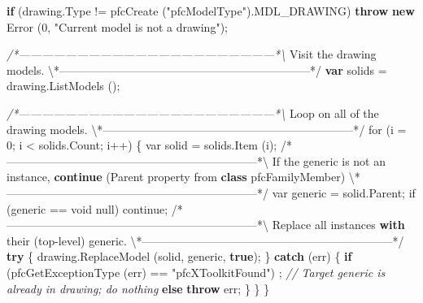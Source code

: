 \documentclass[]{article}
\newenvironment{Shaded}{}{}
\newcommand{\KeywordTok}[1]{\textcolor[rgb]{0.00,0.44,0.13}{\textbf{{#1}}}}
\newcommand{\DecValTok}[1]{\textcolor[rgb]{0.25,0.63,0.44}{{#1}}}
\newcommand{\FloatTok}[1]{\textcolor[rgb]{0.25,0.63,0.44}{{#1}}}
\newcommand{\StringTok}[1]{\textcolor[rgb]{0.25,0.44,0.63}{{#1}}}
\newcommand{\CommentTok}[1]{\textcolor[rgb]{0.38,0.63,0.69}{\textit{{#1}}}}
\newcommand{\OtherTok}[1]{\textcolor[rgb]{0.00,0.44,0.13}{{#1}}}
\newcommand{\FunctionTok}[1]{\textcolor[rgb]{0.02,0.16,0.49}{{#1}}}
\newcommand{\NormalTok}[1]{{#1}}
\begin{document}
\begin{Shaded}
\begin{Highlighting}[]
  \KeywordTok{if} \NormalTok{(}\OtherTok{drawing}\NormalTok{.}\FunctionTok{Type} \NormalTok{!= }\FunctionTok{pfcCreate} \NormalTok{(}\StringTok{"pfcModelType"}\NormalTok{).}\FunctionTok{MDL_DRAWING}\NormalTok{)}
    \KeywordTok{throw} \KeywordTok{new} \FunctionTok{Error} \NormalTok{(}\DecValTok{0}\NormalTok{, }\StringTok{"Current model is not a drawing"}\NormalTok{);}
    
\CommentTok{/*------------------------------------------------------------------*\textbackslash{}}
  \NormalTok{Visit the drawing }\OtherTok{models}\NormalTok{.}
\NormalTok{\textbackslash{}*------------------------------------------------------------------*}\OtherTok{/}
  \KeywordTok{var} \NormalTok{solids = }\OtherTok{drawing}\NormalTok{.}\FunctionTok{ListModels} \NormalTok{();}
  
\CommentTok{/*------------------------------------------------------------------*\textbackslash{}}
  \NormalTok{Loop on all of the drawing }\OtherTok{models}\NormalTok{.}
\NormalTok{\textbackslash{}*------------------------------------------------------------------*}\OtherTok{/  }
\OtherTok{  for }\FloatTok{(}\OtherTok{i = 0; i < solids.Count; i}\FloatTok{++)}
\OtherTok{    \{}
\OtherTok{      var solid = solids.Item }\FloatTok{(}\OtherTok{i}\FloatTok{)}\OtherTok{;}
\OtherTok{/}\NormalTok{*------------------------------------------------------------------*\textbackslash{}}
  \NormalTok{If the generic is not an instance, }\KeywordTok{continue} \NormalTok{(Parent property }
  \NormalTok{from }\KeywordTok{class} \NormalTok{pfcFamilyMember)}
\NormalTok{\textbackslash{}*------------------------------------------------------------------*}\OtherTok{/ }
\OtherTok{      var generic = solid.Parent;}
\OtherTok{      }
\OtherTok{      if }\FloatTok{(}\OtherTok{generic == void null}\FloatTok{)}
\OtherTok{        continue;}
\OtherTok{      }
\OtherTok{/}\NormalTok{*------------------------------------------------------------------*\textbackslash{}}
  \NormalTok{Replace all instances }\KeywordTok{with} \FunctionTok{their} \NormalTok{(top-level) }\OtherTok{generic}\NormalTok{.}
\NormalTok{\textbackslash{}*------------------------------------------------------------------*}\OtherTok{/}
      \KeywordTok{try}
    \NormalTok{\{}
      \OtherTok{drawing}\NormalTok{.}\FunctionTok{ReplaceModel} \NormalTok{(solid, generic, }\KeywordTok{true}\NormalTok{);}
    \NormalTok{\}}
      \KeywordTok{catch} \NormalTok{(err)}
    \NormalTok{\{}
      \KeywordTok{if} \NormalTok{(}\FunctionTok{pfcGetExceptionType} \NormalTok{(err) == }\StringTok{"pfcXToolkitFound"}\NormalTok{)}
        \NormalTok{; }\CommentTok{// Target generic is already in drawing; do nothing}
      \KeywordTok{else}
        \KeywordTok{throw} \NormalTok{err;}
    \NormalTok{\}}
    \NormalTok{\}}
\NormalTok{\}}


\end{Highlighting}
\end{Shaded}
\end{document}
